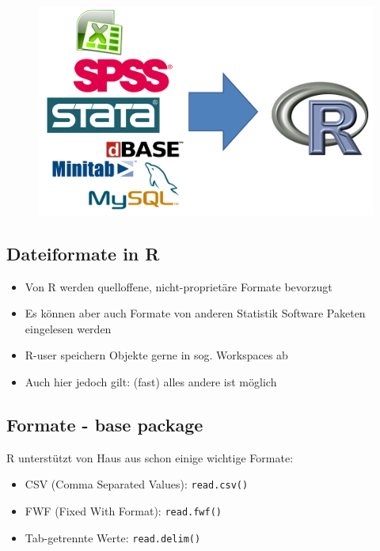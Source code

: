 \documentclass[]{article}
\providecommand{\tightlist}{%
  \setlength{\itemsep}{0pt}\setlength{\parskip}{0pt}}
\begin{document}
\begin{figure}[htbp]
\centering
\includegraphics{figure/Datenimport.PNG}
\caption{}
\end{figure}

\subsection{Dateiformate in R}\label{dateiformate-in-r}

\begin{itemize}
\tightlist
\item
  Von R werden quelloffene, nicht-proprietäre Formate bevorzugt
\item
  Es können aber auch Formate von anderen Statistik Software Paketen
  eingelesen werden
\item
  R-user speichern Objekte gerne in sog. Workspaces ab
\item
  Auch hier jedoch gilt: (fast) alles andere ist möglich
\end{itemize}

\subsection{Formate - base package}\label{formate---base-package}

R unterstützt von Haus aus schon einige wichtige Formate:

\begin{itemize}
\tightlist
\item
  CSV (Comma Separated Values): \texttt{read.csv()}
\item
  FWF (Fixed With Format): \texttt{read.fwf()}
\item
  Tab-getrennte Werte: \texttt{read.delim()}
\end{itemize}
\end{document}
